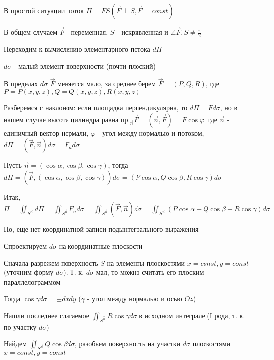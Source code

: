 \documentclass[12pt]{article}
\begin{document}
    В простой ситуации поток $\Pi = FS (\overrightarrow{F} \perp S, \overrightarrow{F} = const)$

    В общем случаем $\overrightarrow{F}$ - переменная, $S$ - искривленная и $\angle \overrightarrow{F}, S \neq \frac{\pi}{2}$

    Переходим к вычислению элементарного потока $d\Pi$

    $d\sigma$ - малый элемент поверхности (почти плоский)

    В пределах $d\sigma$ $\overrightarrow{F}$ меняется мало, за среднее берем $\overrightarrow{F} = (P, Q, R)$, где $P = P(x, y, z), Q = Q(x, y, z), R(x, y, z)$

    Разберемся с наклоном: если площадка перпендикулярна, то $d\Pi = F d\sigma$,
    но в нашем случае высота цилиндра равна $\text{пр.}_{\overrightarrow{n}} \overrightarrow{F} = (\overrightarrow{n}, \overrightarrow{F}) = F \cos\varphi$, где $\overrightarrow{n}$ - единичный вектор нормали, $\varphi$ - угол между нормалью и потоком,
    $d\Pi = (\overrightarrow{F}, \overrightarrow{n}) d\sigma = F_n d\sigma$

    Пусть $\overrightarrow{n} = (\cos\alpha, \cos\beta, \cos\gamma)$, тогда $d\Pi = (\overrightarrow{F}, (\cos\alpha, \cos\beta, \cos\gamma)) d\sigma =
    (P\cos\alpha, Q\cos\beta, R\cos\gamma)d\sigma$

    Итак, $\Pi = \iint_{S^{\overrightarrow{n}}} d\Pi = \iint_{S^{\overrightarrow{n}}} F_n d\sigma = \iint_{S^{\overrightarrow{n}}} (\overrightarrow{F}, \overrightarrow{n})d\sigma = \iint_{S^{\overrightarrow{n}}} (P\cos\alpha + Q\cos\beta + R\cos\gamma)d\sigma$

    Но, еще нет координатной записи подынтегрального выражения

    Спроектируем $d\sigma$ на координатные плоскости

    Сначала разрежем поверхность $S$ на элементы плоскостями $x = const, y = const$ (уточним форму $d\sigma$). Т. к. $d\sigma$ мал, то можно считать его плоским параллелограммом

    Тогда $\cos\gamma d\sigma = \pm dxdy$ ($\gamma$ - угол между нормалью и осью $Oz$)

    Нашли последнее слагаемое $\iint_{S^{\overrightarrow{n}}} R\cos\gamma d\sigma$ в исходном интеграле (I рода, т. к. по участку $d\sigma$)

    Найдем $\iint_{S^{\overrightarrow{n}}} Q\cos\beta d\sigma$, разобьем поверхность на участки $d\sigma$ плоскостями $x = const, y = const$
\end{document}
